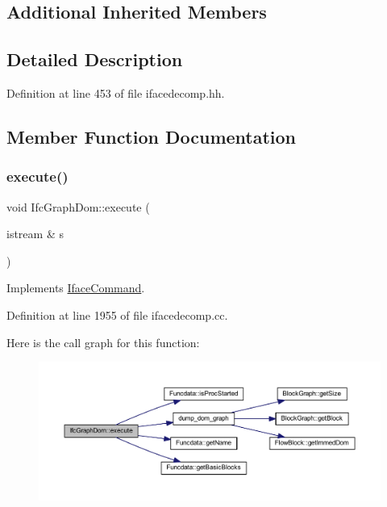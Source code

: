 \subsection*{Additional Inherited Members}


\subsection{Detailed Description}


Definition at line 453 of file ifacedecomp.\+hh.



\subsection{Member Function Documentation}
\mbox{\label{class_ifc_graph_dom_aa784fb7316319c32eeee3e2b10c58b86}} 
\subsubsection{\texorpdfstring{execute()}{execute()}}
{\footnotesize\ttfamily void Ifc\+Graph\+Dom\+::execute (\begin{DoxyParamCaption}\item[{istream \&}]{s }\end{DoxyParamCaption})\hspace{0.3cm}{\ttfamily [virtual]}}



Implements \mbox{\hyperlink{class_iface_command_af10e29cee2c8e419de6efe9e680ad201}{Iface\+Command}}.



Definition at line 1955 of file ifacedecomp.\+cc.

Here is the call graph for this function\+:
\nopagebreak
\begin{figure}[H]
\begin{center}
\leavevmode
\includegraphics[width=350pt]{class_ifc_graph_dom_aa784fb7316319c32eeee3e2b10c58b86_cgraph}
\end{center}
\end{figure}


